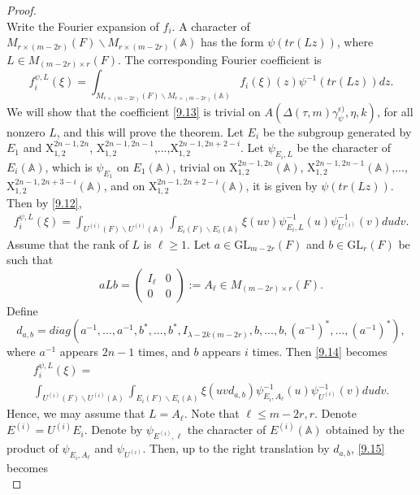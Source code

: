 \documentclass[12pts]{amsart}
\newcommand{\BA}{{\mathbb {A}}}
\newcommand{\GL}{{\mathrm{GL}}}
\begin{document}
\begin{proof}
\begin{equation}
\end{equation}
Write the Fourier expansion of $f_i$. A character of $M_{r\times (m-2r)}(F)\backslash M_{r\times (m-2r)}(\BA)$ has the form $\psi(tr(Lz))$, where $L\in M_{(m-2r)\times r}(F)$. The corresponding Fourier coefficient is
\begin{equation}\label{9.13}
f_i^{\psi,L}(\xi)=\int_{M_{r\times (m-2r)}(F)\backslash M_{r\times (m-2r)}(\BA)}f_i(\xi)(z)\psi^{-1}(tr(Lz))dz.
\end{equation}
We will show that the coefficient \eqref{9.13} is trivial on $A(\Delta(\tau,m)\gamma_\psi^{\epsilon)},\eta,k)$, for all nonzero $L$, and this will prove the theorem. Let $E_i$ be the subgroup generated by $E_1$ and $\mathrm{X}_{1,2}^{2n-1,2n}$, $\mathrm{X}_{1,2}^{2n-1,2n-1}$,...,$\mathrm{X}_{1,2}^{2n-1,2n+2-i}$. Let $\psi_{E_i,L}$ be the character of $E_i(\BA)$, which is $\psi_{E_1}$ on $E_1(\BA)$, trivial on $\mathrm{X}_{1,2}^{2n-1,2n}(\BA)$, $\mathrm{X}_{1,2}^{2n-1,2n-1}(\BA)$,...,$\mathrm{X}_{1,2}^{2n-1,2n+3-i}(\BA)$, and on $\mathrm{X}_{1,2}^{2n-1,2n+2-i}(\BA)$, it is given by $\psi(tr(Lz))$. Then by \eqref{9.12},
\begin{multline}\label{9.14}
f_i^{\psi,L}(\xi)=
\int_{U^{(i)}(F)\backslash
	U^{(i)}(\BA)}\int_{E_i(F)\backslash E_i(\BA)}\xi(uv)\psi^{-1}_{E_i,L}(u)\psi^{-1}_{U^{(i)}}(v)dudv.
\end{multline}
Assume that the rank of $L$ is $\ell\geq 1$. Let $a\in \GL_{m-2r}(F)$ and $b\in \GL_r(F)$ be such that 
$$
aLb=\begin{pmatrix}I_\ell&0\\0&0\end{pmatrix}:=A_\ell\in M_{(m-2r)\times r}(F).
$$
Define 
$$
d_{a,b}=diag(a^{-1},...,a^{-1},b^*,...,b^*,I_{\lambda-2k(m-2r)},b,...,b,(a^{-1})^*,...,(a^{-1})^*),
$$
where $a^{-1}$ appears $2n-1$ times, and $b$ appears $i$ times. Then \eqref{9.14} becomes
\begin{multline}\label{9.15}
f_i^{\psi,L}(\xi)=\\
\int_{U^{(i)}(F)\backslash
	U^{(i)}(\BA)}\int_{E_i(F)\backslash E_i(\BA)}\xi(uvd_{a,b})\psi^{-1}_{E_i,A_\ell}(u)\psi_{U^{(i)}}^{-1}(v)dudv.
\end{multline}
Hence, we may assume that $L=A_\ell$. Note that $\ell\leq m-2r, r$. Denote $E^{(i)}=U^{(i)}E_i$. Denote by $\psi_{E^{(i)},\ell}$ the character of $E^{(i)}(\BA)$ obtained by the product of $\psi_{E_i,A_\ell}$ and $\psi_{U^{(i)}}$. Then, up to the right translation by $d_{a,b}$, \eqref{9.15} becomes
\begin{equation}\label{9.15.1}

\end{equation}
\end{proof}
\end{document}
